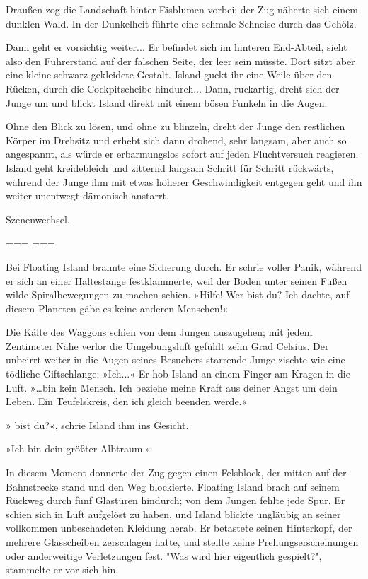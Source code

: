Draußen zog die Landschaft hinter Eisblumen vorbei; der Zug näherte sich einem dunklen Wald. In der Dunkelheit führte eine schmale Schneise durch das Gehölz.

Dann geht er vorsichtig weiter... Er befindet sich im hinteren End-Abteil, sieht also den Führerstand auf der falschen Seite, der leer sein müsste. Dort sitzt aber eine kleine schwarz gekleidete Gestalt. Island guckt ihr eine Weile über den Rücken, durch die Cockpitscheibe hindurch... Dann, ruckartig, dreht sich der Junge um und blickt Island direkt mit einem bösen Funkeln in die Augen.

Ohne den Blick zu lösen, und ohne zu blinzeln, dreht der Junge den restlichen Körper im Drehsitz und erhebt sich dann drohend, sehr langsam, aber auch so angespannt, als würde er erbarmungslos sofort auf jeden Fluchtversuch reagieren. Island geht kreidebleich und zitternd langsam Schritt für Schritt rückwärts, während der Junge ihm mit etwas höherer Geschwindigkeit entgegen geht und ihn weiter unentwegt dämonisch anstarrt.

Szenenwechsel.

=== ===

Bei Floating Island brannte eine Sicherung durch. Er schrie voller Panik, während er sich an einer Haltestange festklammerte, weil der Boden unter seinen Füßen wilde Spiralbewegungen zu machen schien. »Hilfe!  Wer bist du? Ich dachte, auf diesem Planeten gäbe es keine anderen Menschen!«

Die Kälte des Waggons schien von dem Jungen auszugehen; mit jedem Zentimeter Nähe verlor die Umgebungsluft gefühlt zehn Grad Celsius. Der unbeirrt weiter in die Augen seines Besuchers starrende Junge zischte wie eine tödliche Giftschlange: »Ich...« Er hob Island an einem Finger am Kragen in die Luft. »…bin kein Mensch. Ich beziehe meine Kraft aus deiner Angst um dein Leben. Ein Teufelskreis, den ich gleich beenden werde.«

» bist du?«, schrie Island ihm ins Gesicht.

»Ich bin dein größter Albtraum.«

In diesem Moment donnerte der Zug gegen einen Felsblock, der mitten auf der Bahnstrecke stand und den Weg blockierte. Floating Island brach auf seinem Rückweg durch fünf Glastüren hindurch; von dem Jungen fehlte jede Spur. Er schien sich in Luft aufgelöst zu haben, und Island blickte ungläubig an seiner vollkommen unbeschadeten Kleidung herab. Er betastete seinen Hinterkopf, der mehrere Glasscheiben zerschlagen hatte, und stellte keine Prellungserscheinungen oder anderweitige Verletzungen fest. "Was wird hier eigentlich gespielt?", stammelte er vor sich hin.


